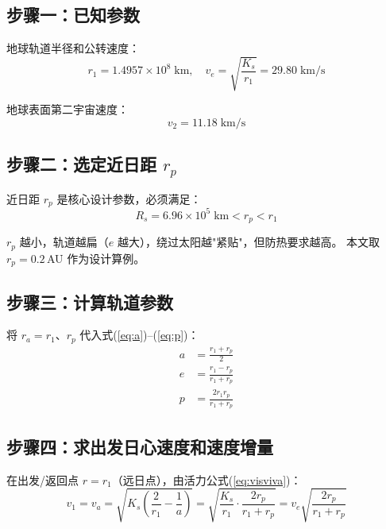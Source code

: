\documentclass[UTF8,12pt,a4paper]{ctexart}
\begin{document}
\subsection{步骤一：已知参数}

地球轨道半径和公转速度\cite[\S6.3, pp.~122]{qian2008}：
\begin{equation}\label{eq:ve}
    r_1 = 1.4957 \times 10^8\;\text{km}, \quad
    v_e = \sqrt{\frac{K_s}{r_1}} = 29.80\;\text{km/s}
\end{equation}

地球表面第二宇宙速度\cite[\S1.5, pp.~15]{qian2008}：
\begin{equation}
    v_2 = 11.18\;\text{km/s}
\end{equation}

\subsection{步骤二：选定近日距 \texorpdfstring{$r_p$}{rₚ}}

近日距 $r_p$ 是核心设计参数，必须满足：
\begin{equation}
    R_s = 6.96 \times 10^5\;\text{km} < r_p < r_1
\end{equation}

$r_p$ 越小，轨道越扁（$e$ 越大），绕过太阳越"紧贴"，但防热要求越高。
本文取 $r_p = 0.2$\,AU 作为设计算例。

\subsection{步骤三：计算轨道参数}

将 $r_a = r_1$、$r_p$ 代入式(\ref{eq:a})--(\ref{eq:p})：
\begin{align}
    a    &= \frac{r_1 + r_p}{2} \label{eq:step_a} \\
    e    &= \frac{r_1 - r_p}{r_1 + r_p} \label{eq:step_e} \\
    p    &= \frac{2r_1 r_p}{r_1 + r_p} \label{eq:step_p}
\end{align}

\subsection{步骤四：求出发日心速度和速度增量}

在出发/返回点 $r = r_1$（远日点），由活力公式(\ref{eq:visviva})：
\begin{equation}\label{eq:v1}
    v_1 = v_a = \sqrt{K_s\left(\frac{2}{r_1} - \frac{1}{a}\right)}
        = \sqrt{\frac{K_s}{r_1}\cdot\frac{2r_p}{r_1+r_p}}
        = v_e\sqrt{\frac{2r_p}{r_1+r_p}}
\end{equation}
\end{document}

